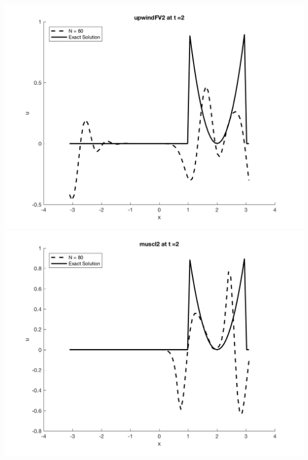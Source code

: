 \documentclass[11pt, oneside]{article}
\begin{document}
\begin{enumerate}
\begin{center}
      \includegraphics[scale=0.4]{Figures/06_06.png}
      \includegraphics[scale=0.4]{Figures/06_07.png}
    \end{center}

\end{enumerate}
\end{document}
